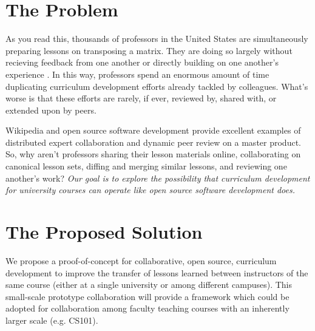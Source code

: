 \documentclass[11pt]{article}
\makeatletter
\newcommand{\authorname}{Kathryn~D.~Huff }
\newcommand{\authoremail}{katyhuff@illinois.edu}
\newcommand{\authorsite}{arfc.npre.illinois.edu}
\makeatother
\begin{document}
          \pagestyle{fancy}
          \lhead{\textcolor{gray}{Investigator: Prof. \authorname 
          <\authoremail>}}
          \rhead{\textcolor{gray}{SIIP Pre-Proposal\\Dept. of Nuclear, 
          Plasma, and Radiological Engineering}}
          \renewcommand{\headrulewidth}{0pt}
          \renewcommand{\footrulewidth}{0pt}
          \fancyfoot[C]{\footnotesize \textcolor{gray}{\authorsite}}

          \section{The Problem}
          As you read this, thousands of professors in the United States are 
          simultaneously preparing lessons on transposing a matrix.
          They are doing so largely without recieving feedback from one another 
          or directly building on one another's experience 
          \cite{wilson_software_2014}. In this way, professors spend an enormous amount of time 
          duplicating curriculum development efforts already tackled 
          by colleagues. What's worse is that these efforts are 
          rarely, if ever, reviewed by, shared with, or extended upon by 
          peers.
          
          Wikipedia and open source software development provide excellent 
          examples of distributed expert collaboration and dynamic peer review 
          on a master product. So, why aren't professors sharing their lesson 
          materials online, collaborating on canonical lesson sets, 
          diffing and merging similar lessons, and reviewing one another's 
          work? \emph{Our goal is to explore the possibility that curriculum development for 
          university courses can operate like open source software development 
          does.}

          \section{The Proposed Solution}
          We propose a proof-of-concept for collaborative, open source, 
          curriculum development to improve the transfer of lessons learned 
          between instructors of the same course (either at a single university or 
          among different campuses). This small-scale prototype collaboration 
          will provide a framework which could be adopted for collaboration among faculty 
          teaching courses with an inherently larger scale (e.g. CS101).
          
\end{document}
